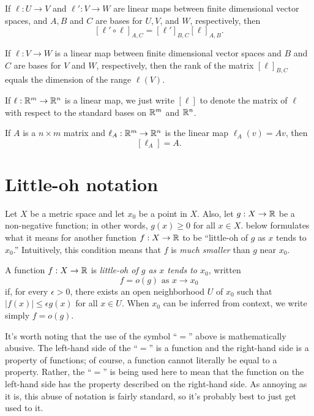 \begin{lemma}
	If $\ell : U \to V$ and $\ell' :  V \to W$ are linear maps between finite dimensional vector spaces, and $A, B$ and $C$ are bases for $U, V$, and $W$, respectively, then 
	\[ [\ell' \circ \ell]_{A,C} = [\ell']_{B,C}[\ell]_{A,B}. \]
\end{lemma}

\begin{lemma}
	If $\ell : V \to W$ is a linear map between finite dimensional vector spaces and $B$ and $C$ are bases for $V$ and $W$, respectively, then the rank of the matrix $[\ell]_{B,C}$ equals the dimension of the range $\ell(V)$.
\end{lemma}

\begin{definition}
	If $\ell : \mathbb{R}^m \to \mathbb{R}^n$ is a linear map, we just write $[\ell]$ to denote the matrix of $\ell$ with respect to the standard bases on $\mathbb{R}^m$ and $\mathbb{R}^n$.
\end{definition} 

\begin{lemma}
	If $A$ is a $n \times m$ matrix and $\ell_A : \mathbb{R}^m \to \mathbb{R}^n$ is the linear map $\ell_A(v) = Av$, then \[ [\ell_A] = A. \]
\end{lemma} 

\section{Little-oh notation}

Let $X$ be a metric space and let $x_0$ be a point in $X$. Also, let $g : X \to \mathbb{R}$ be a non-negative function; in other words, $g(x) \geq 0$ for all $x \in X$.  below formulates what it means for another function $f : X \to \mathbb{R}$ to be ``little-oh of $g$ as $x$ tends to $x_0$.'' Intuitively, this condition means that $f$ is \emph{much smaller} than $g$ near $x_0$. 

\begin{definition} \label{little-o-definition}
	A function $f : X \to \mathbb{R}$ is \emph{little-oh of $g$ as $x$ tends to $x_0$}, written \[ f = o(g) \text{ as } x \to x_0 \] 
	if, for every $\epsilon > 0$, there exists an open neighborhood $U$ of $x_0$ such that $|f(x)| \leq \epsilon g(x)$ for all $x \in U$. When $x_0$ can be inferred from context, we write simply $f = o(g)$. 
\end{definition} 

\begin{remark}
	It's worth noting that the use of the symbol ``$=$'' above is mathematically abusive. The left-hand side of the ``$=$'' is a function and the right-hand side is a property of functions; of course, a function cannot literally be equal to a property. Rather, the ``$=$'' is being used here to mean that the function on the left-hand side has the property described on the right-hand side. As annoying as it is, this abuse of notation is fairly standard, so it's probably best to just get used to it. 
\end{remark}

